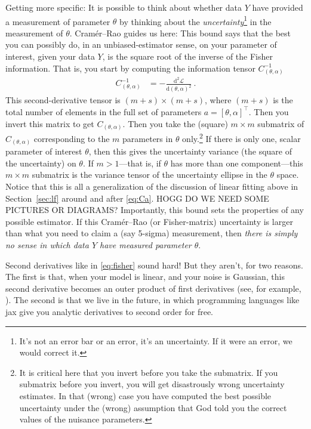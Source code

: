 \documentclass{article}
\newcommand{\sectionname}{Section}
\newcommand{\secref}[1]{\sectionname~\ref{#1}}
\newcommand{\dd}{\mathrm{d}}
\begin{document}
Getting more specific:
It is possible to think about whether data $Y$ have provided a measurement of parameter $\theta$ by thinking about the \emph{uncertainty}\footnote{%
It's not an error bar or an error, it's an uncertainty. If it were an error, we would correct it.}
in the measurement of $\theta$.
Cram\'er--Rao guides us here:
This bound says that the best you can possibly do, in an unbiased-estimator sense, on your parameter of interest, given your data $Y$, is the square root of the inverse of the Fisher information.
That is, you start by computing the information tensor $C^{-1}_{(\theta,\alpha)}$
\begin{align}
    C^{-1}_{(\theta,\alpha)} &= - \frac{\dd^2\mathscr{L}}{\dd(\theta,\alpha)^2} ~.\label{eq:fisher}
\end{align}
This second-derivative tensor is $(m+s)\times (m+s)$, where $(m+s)$ is the total number of elements in the full set of parameters $a = [\theta,\alpha]^\top$.
Then you invert this matrix to get $C_{(\theta,\alpha)}$.
Then you take the (square) $m\times m$ submatrix of $C_{(\theta,\alpha)}$ corresponding to the $m$ parameters in $\theta$ only.\footnote{It is critical here that you invert before you take the submatrix. If you submatrix before you invert, you will get disastrously wrong uncertainty estimates. In that (wrong) case you have computed the best possible uncertainty under the (wrong) assumption that God told you the correct values of the nuisance parameters.}
If there is only one, scalar parameter of interest $\theta$, then this gives the uncertainty variance (the square of the uncertainty) on $\theta$.
If $m>1$---that is, if $\theta$ has more than one component---this $m\times m$ submatrix is the variance tensor of the uncertainty ellipse in the $\theta$ space.
Notice that this is all a generalization of the discussion of linear fitting above in \secref{sec:lf} around and after \eqref{eq:Ca}.
HOGG DO WE NEED SOME PICTURES OR DIAGRAMS?
Importantly, this bound sets the properties of any possible estimator.
If this Cram\'er--Rao (or Fisher-matrix) uncertainty is larger than what you need to claim a (say 5-sigma) measurement, then \emph{there is simply no sense in which data $Y$ have measured parameter $\theta$}.

Second derivatives like in \eqref{eq:fisher} sound hard!
But they aren't, for two reasons.
The first is that, when your model is linear, and your noise is Gaussian, this second derivative becomes an outer product of first derivatives (see, for example, \cite{fittingaline}).
The second is that we live in the future, in which programming languages like jax \cite{jax} give you analytic derivatives to second order for free.
\end{document}
